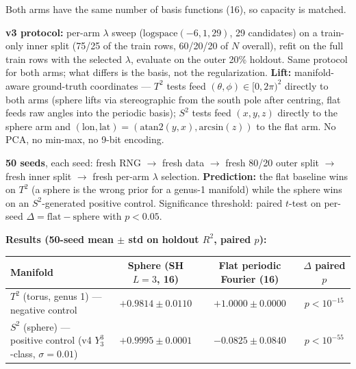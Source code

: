 \documentclass[11pt,a4paper]{article}
\theoremstyle{plain}
\theoremstyle{remark}
\theoremstyle{plain}
\begin{document}
Both arms have the same number of basis functions (16), so capacity is matched.

\textbf{v3 protocol:} per-arm $\lambda$ sweep ($\mathrm{logspace}(-6, 1, 29)$, 29 candidates) on a train-only inner split (75/25 of the train rows, 60/20/20 of $N$ overall), refit on the full train rows with the selected $\lambda$, evaluate on the outer 20\% holdout. Same protocol for both arms; what differs is the basis, not the regularization. \textbf{Lift:} manifold-aware ground-truth coordinates --- $T^2$ tests feed $(\theta, \phi) \in [0, 2\pi)^2$ directly to both arms (sphere lifts via stereographic from the south pole after centring, flat feeds raw angles into the periodic basis); $S^2$ tests feed $(x,y,z)$ directly to the sphere arm and $(\mathrm{lon}, \mathrm{lat}) = (\mathrm{atan2}(y,x), \mathrm{arcsin}(z))$ to the flat arm. No PCA, no min-max, no 9-bit encoding.

\textbf{50 seeds}, each seed: fresh RNG $\to$ fresh data $\to$ fresh 80/20 outer split $\to$ fresh inner split $\to$ fresh per-arm $\lambda$ selection. \textbf{Prediction:} the flat baseline wins on $T^2$ (a sphere is the wrong prior for a genus-1 manifold) while the sphere wins on an $S^2$-generated positive control. Significance threshold: paired $t$-test on per-seed $\Delta = \mathrm{flat} - \mathrm{sphere}$ with $p < 0.05$.

\textbf{Results (50-seed mean $\pm$ std on holdout $R^2$, paired $p$):}

\begin{table}[h]
\centering
\begin{tabular}{lccc}
\hline
\textbf{Manifold} & \textbf{Sphere (SH $L{=}3$, 16)} & \textbf{Flat periodic Fourier (16)} & \textbf{$\Delta$ paired $p$} \\
\hline
$T^2$ (torus, genus 1) --- negative control & $+0.9814 \pm 0.0110$ & $+1.0000 \pm 0.0000$ & $p < 10^{-15}$ \\
$S^2$ (sphere) --- positive control (v4 $Y_3^3$-class, $\sigma = 0.01$) & $+0.9995 \pm 0.0001$ & $-0.0825 \pm 0.0840$ & $p < 10^{-55}$ \\
\hline
\end{tabular}
\end{table}
\end{document}
